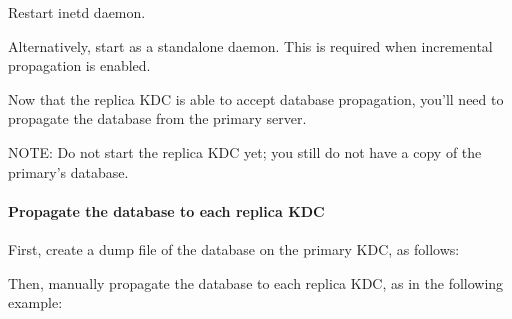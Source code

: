 \documentclass[letterpaper,10pt,english]{sphinxmanual}
\begin{document}
\begin{sphinxVerbatim}[commandchars=\\\{\}]
                      
\end{sphinxVerbatim}

\sphinxAtStartPar
Restart inetd daemon.

\sphinxAtStartPar
Alternatively, start {\hyperref[\detokenize{admin/admin_commands/kpropd:kpropd-8}]{}} as a stand\sphinxhyphen{}alone daemon.  This is
required when incremental propagation is enabled.

\sphinxAtStartPar
Now that the replica KDC is able to accept database propagation,
you’ll need to propagate the database from the primary server.

\sphinxAtStartPar
NOTE: Do not start the replica KDC yet; you still do not have a copy
of the primary’s database.


\paragraph{Propagate the database to each replica KDC}
\label{\detokenize{admin/install_kdc:propagate-the-database-to-each-replica-kdc}}\label{\detokenize{admin/install_kdc:kprop-to-replicas}}
\sphinxAtStartPar
First, create a dump file of the database on the primary KDC, as
follows:

\begin{sphinxVerbatim}[commandchars=\\\{\}]
   
\end{sphinxVerbatim}

\sphinxAtStartPar
Then, manually propagate the database to each replica KDC, as in the
following example:

\begin{sphinxVerbatim}[commandchars=\\\{\}]
    

    
\end{sphinxVerbatim}
\end{document}
